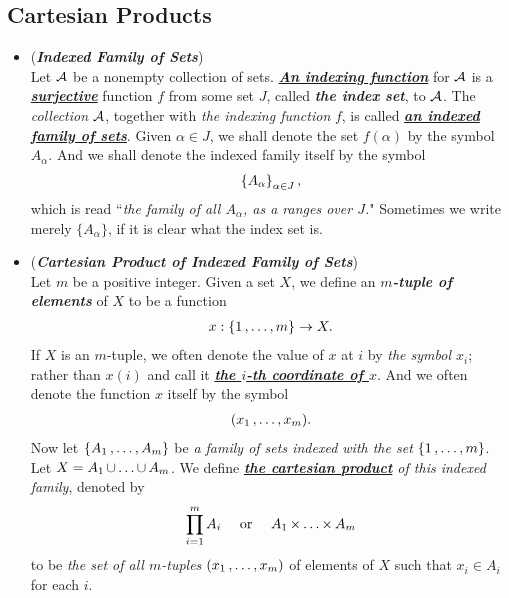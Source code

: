 \documentclass[11pt]{article}
\begin{document}
\subsection{Cartesian Products}
\begin{itemize}
\item \begin{definition} (\emph{\textbf{Indexed Family of Sets}})\\
Let ${\mathcal A}$ be a nonempty collection of sets. \underline{\emph{\textbf{An indexing function}}} for ${\mathcal A}$ is a \underline{\emph{\textbf{surjective}}} function $f$ from some set $J$, called \emph{\textbf{the index set}}, to ${\mathcal A}$. The \emph{collection} ${\mathcal A}$, together with \emph{the indexing function} $f$, is called \underline{\emph{\textbf{an indexed family of sets}}}. Given $\alpha \in J$, we shall denote the set $f(\alpha)$ by the symbol $A_{\alpha}$. And we shall denote the indexed family itself by the symbol
\begin{align*}
\left\{A_{\alpha}\right\}_{\alpha \in J},
\end{align*}
which is read ``\emph{the family of all $A_{\alpha}$, as a ranges over $J$.}" Sometimes we write merely $\{A_{\alpha}\}$, if it is clear what the index set is.
\end{definition}

\item \begin{definition} (\emph{\textbf{Cartesian Product of Indexed Family of Sets}})\\
Let $m$ be a positive integer. Given a set $X$, we define an \emph{\textbf{$m$-tuple of elements}} of $X$ to be a function
\begin{align*}
x: \left\{1 \,{,}\ldots{,}\, m\right\} \rightarrow X.
\end{align*}
If $X$ is an $m$-tuple, we often denote the value of $x$ at $i$ by \emph{the symbol $x_i$}; rather than $x(i)$ and call it \underline{\emph{\textbf{the $i$-th coordinate of $x$}}}. And we often denote the function $x$ itself by the symbol
\begin{align*}
(x_1 \,{,}\ldots{,}\, x_m).
\end{align*}
Now let $\{A_1 \,{,}\ldots{,}\, A_m\}$ be \emph{a family of sets indexed with the set} $\{1 \,{,}\ldots{,}\, m\}$. Let $X = A_1 \,{\cup}\ldots{\cup}\, A_m$. We define \emph{\textbf{\underline{the cartesian product}} of this indexed family}, denoted by
\begin{align*}
\prod_{i=1}^{m}A_i \quad \text{ or } \quad A_1 \,{\times}\ldots{\times}\, A_m
\end{align*}
to be \emph{the set of all $m$-tuples} $(x_1 \,{,}\ldots{,}\, x_m)$ of elements of $X$ such that $x_i \in A_i$ for each $i$.
\end{definition}


\end{itemize}
\end{document}
